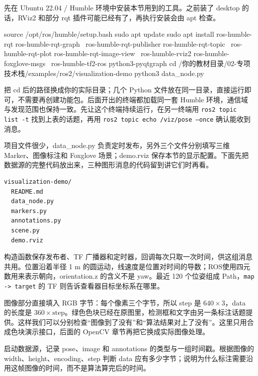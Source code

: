 \begin{example}
先在 Ubuntu 22.04 / Humble 环境中安装本节用到的工具。之前装了 desktop 的话，RViz2 和部分 rqt 插件可能已经有了，再执行安装会由 apt 检查。
\par\medskip\noindent\begin{minipage}{\linewidth}
\begin{tbash}
source /opt/ros/humble/setup.bash
sudo apt update
sudo apt install ros-humble-rqt ros-humble-rqt-graph \
  ros-humble-rqt-publisher ros-humble-rqt-topic \
  ros-humble-rqt-plot ros-humble-rqt-image-view \
  ros-humble-rviz2 ros-humble-foxglove-msgs \
  ros-humble-tf2-ros python3-pyqtgraph
cd /你的教材目录/02-专项技术栈/examples/ros2/visualization-demo
python3 data_node.py
\end{tbash}
\end{minipage}\par\smallskip
把 cd 后的路径换成你的实际目录；几个 Python 文件放在同一目录，直接运行即可，不需要再创建功能包。后面开出的终端都加载同一套 Humble 环境，通信域与发现范围也保持一致。先让这个终端持续运行，在另一终端用 \texttt{ros2 topic list -t} 找到上表的话题，再用 \texttt{ros2 topic echo /viz/pose --once} 确认能收到消息。

项目文件很少，data\_node.py 负责定时发布，另外三个文件分别填写三维 Marker、图像标注和 Foxglove 场景；demo.rviz 保存本节的显示配置。下面先把数据源的完整代码放出来，三种图形消息的代码留到讲它们时再看。
\begin{lstlisting}[language={}]
visualization-demo/
  README.md
  data_node.py
  markers.py
  annotations.py
  scene.py
  demo.rviz
\end{lstlisting}


构造函数保存发布者、TF 广播器和定时器，回调每次只取一次时间，供这组消息共用。位置沿着半径 1 m 的圆运动，线速度是位置对时间的导数；ROS使用四元数用来表示朝向，orientation.z 的含义不是 yaw。最近 120 个位姿组成 Path，\texttt{map -> target} 的 TF 则告诉查看器目标坐标系在哪里。

图像部分直接填入 RGB 字节：每个像素三个字节，所以 step 是 $640\times3$，data 的长度是 $360\times\text{step}$。绿色色块已经在原图里，检测框和文字由另一条标注话题提供。这样我们可以分别检查“图像到了没有”和“算法结果对上了没有”。这里只用合成色块演示接口，后面的 OpenCV 章节再把它换成实际图像处理。
\end{example}

\begin{exercise}\label{ex:v2-ros-viz-source}
启动数据源，记录 pose、image 和 annotations 的类型与一组时间戳。根据图像的 width、height、encoding、step 判断 data 应有多少字节；说明为什么标注需要沿用这帧图像的时间，而不是算法算完后的时间。
\end{exercise}

